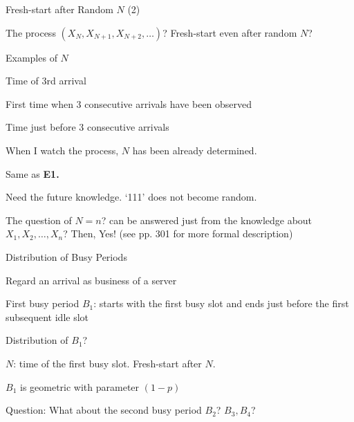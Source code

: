 \documentclass[fleqn,aspectratio=169]{beamer}
\begin{document}
\begin{frame}{Fresh-start after Random $N$ (2)}


 The process $(X_{N},X_{N+1}, X_{N+2}, \ldots)$? Fresh-start even after random $N$?
 
\plitemsep 0.05in
\bci
\item Examples of $N$
{
\small
\bce[\bf E1.]
\item Time of 3rd arrival
\item First time when 3 consecutive arrivals have been observed
\item Time just before 3 consecutive arrivals
\ece
}
{
\vspace{-1cm}
\centering
{}
}

\item<2->[\bf E1.] When I watch the process, $N$ has been already determined. 
\item<3->[\bf E2.] Same as {\bf E1.} 
\item<4->[\bf E3.] Need the future knowledge. `111' does not become random.  

\medskip
\item<5-> The question of $N=n$? can be answered just from the knowledge about $X_1, X_2, \ldots, X_n$? Then, Yes! (see pp. 301 for more formal description)

\eci
\end{frame}

\begin{frame}{Distribution of Busy Periods}

\plitemsep 0.05in
\bci
\item Regard an arrival as business of a server

\item<2-> First busy period $B_1$: starts with the first busy slot and ends just before the first subsequent idle slot


\item<3->  Distribution of $B_1$?


\item<4-> $N$: time of the first busy slot. Fresh-start after $N.$

\item<5-> $B_1$ is geometric with parameter $(1-p)$

\item<6-> Question: What about the second busy period $B_2$? $B_3, B_4$?

\eci
\end{frame}
\end{document}
